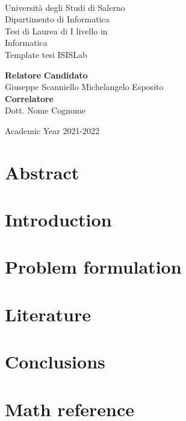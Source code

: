 \documentclass[11pt,oneside]{book}
\theoremstyle{definition}
\begin{document}
    \begin{titlepage}
        \begin{center}
            \\[0.2truecm]
            {\Large Universit\`a degli Studi di Salerno}\\[0.2truecm]
            {\large Dipartimento di Informatica}\\
            \hrulefill
            \vfill
            {\large Tesi di Laurea di I livello in }\\[0.2truecm]
            {\Large Informatica}\\
            \vfill\vfill
            {\Huge Template tesi ISISLab}
            \vfill\vfill
            
            
            {\bf Relatore} \hfill {\bf Candidato}\ \ \\
            Giuseppe Scanniello \hfill Michelangelo Esposito\\
            {\bf Correlatore} \hfill {\bf }\ \ \\
            Dott. Nome Cognome \hfill \ \ \\
            
            \vfill
            \hrulefill 
            
            Academic Year 2021-2022
        
        \end{center}
    \end{titlepage}


    \chapter*{Abstract}
    
    


    \tableofcontents
    \pagestyle{plain}

    \chapter{Introduction}
    \setcounter{page}{1} 	%
    

    \chapter{Problem formulation}
    

    \chapter{Literature}
    

    \chapter{Conclusions}
    

    \chapter{Math reference}
    

    \nocite{*}
    \printbibliography[title={Bibliography}] 
\end{document}
